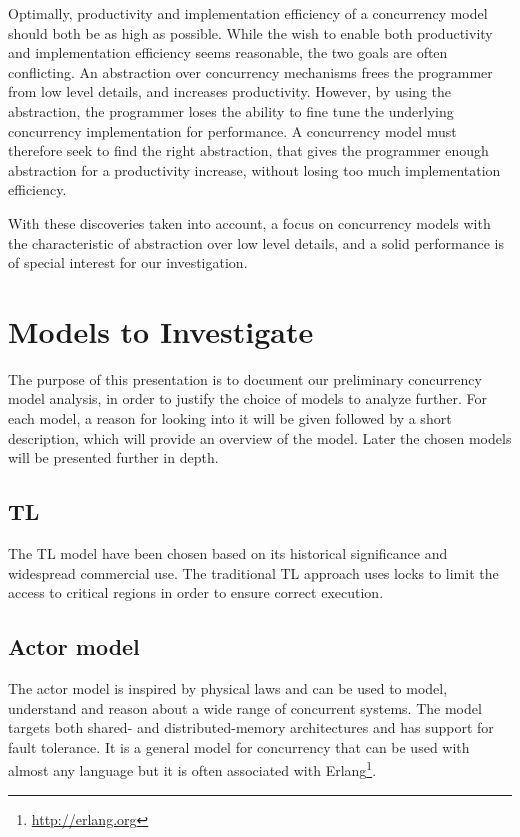 Optimally, productivity and implementation efficiency of a concurrency model should both be as high as possible. While the wish to enable both productivity and implementation efficiency seems reasonable, the two goals are often conflicting. An abstraction over concurrency mechanisms frees the programmer from low level details, and increases productivity. However, by using the abstraction, the programmer loses the ability to fine tune the underlying concurrency implementation for performance. A concurrency model must therefore seek to find the right abstraction, that gives the programmer enough abstraction for a productivity increase, without losing too much implementation efficiency.

With these discoveries taken into account, a focus on concurrency models with the characteristic of abstraction over low level details, and a solid performance is of special interest for our investigation.

\section{Models to Investigate}

The purpose of this presentation is to document our preliminary concurrency model analysis, in order to justify the choice of models to analyze further. For each model, a reason for looking into it will be given followed by a short description, which will provide an overview of the model. Later the chosen models will be presented further in depth.

\subsection{\acl{TL}}
The \ac{TL} model have been chosen based on its historical significance and widespread commercial use\cite[p. 58]{sutter2005software}. The traditional \ac{TL} approach uses locks to limit the access to critical regions in order to ensure correct execution\cite[p. 1]{saha2006mcrt}. 

\subsection{Actor model}
The actor model is inspired by physical laws and can be used to model, understand and reason about a wide range of concurrent systems\cite{hewitt2014actor}. The model targets both shared- and distributed-memory architectures and has support for fault tolerance\cite[Chap. 5]{sevenModels}. It is a general model for concurrency that can be used with almost any language but it is often associated with Erlang\footnote{\url{http://erlang.org}}.
 
